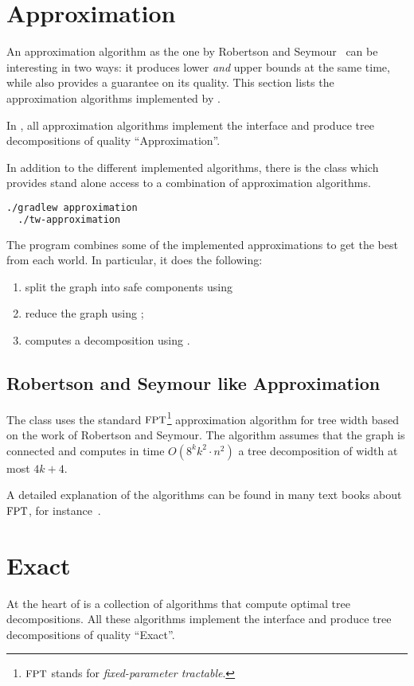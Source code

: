 \documentclass[a4paper, ukenglish, twoside, openright]{jdrasilmanual}
\begin{document}
\chapter{Approximation}
An approximation algorithm as the one by Robertson and Seymour~\cite{RobertsonS1995} can be interesting in two ways: it
produces lower \emph{and} upper bounds at the same time, while also
provides a guarantee on its quality. This section lists the
approximation algorithms implemented by \Jdrasil.

In \Jdrasil{}, all approximation algorithms implement the interface
 and produce tree decompositions of quality ``Approximation''.

In addition to the different implemented algorithms, there is the
class  which provides stand alone access to a
combination of approximation algorithms.
\begin{lstlisting}[language=bash]
  ./gradlew approximation
  ./tw-approximation
\end{lstlisting}
The program combines some of the implemented approximations to get the
best from each world. In particular, it does the following:
\begin{enumerate}
  \item split the graph into safe components using 
  \item reduce the graph using ;
  \item computes a decomposition using .
\end{enumerate}

\section{Robertson and Seymour like Approximation}
The class  uses the standard
$\Class{FPT}$\footnote{$\Class{FPT}$ stands for \emph{fixed-parameter
    tractable}.} approximation algorithm for tree width based on the work of Robertson and Seymour.
The algorithm assumes that the graph is connected and computes in time \(O(8^k k^2 \cdot n^2)\) a tree decomposition
of width at most \(4k+4\).

A detailed explanation of the algorithms can be found in many text
books about $\Class{FPT}$, for instance~\cite{CyganFKLMPPS2015, FlumGrohe2006}.

\chapter{Exact}
At the heart of \Jdrasil{} is a collection of algorithms that compute
optimal tree decompositions. All these algorithms implement the interface
 and produce tree decompositions of quality ``Exact''.
\end{document}
